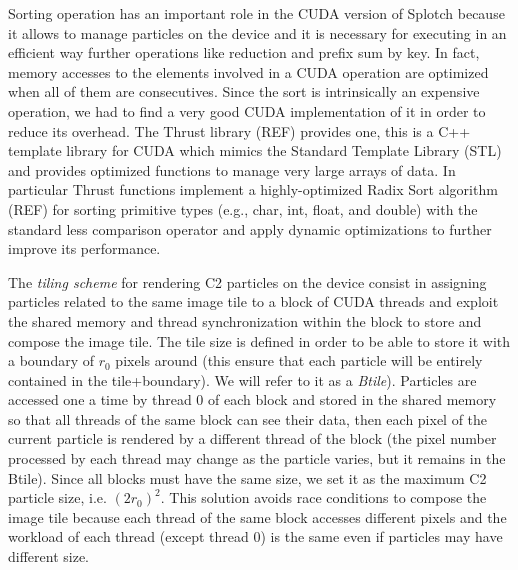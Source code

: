 \documentclass[11pt]{article}
\begin{document}
Sorting operation has an important role in the CUDA version of Splotch because it allows to manage particles on the device and it is necessary for executing in an efficient way further operations like reduction and prefix sum by key. In fact, memory accesses to the elements involved in a CUDA operation are optimized when all of them are consecutives. Since the sort is intrinsically an expensive operation, we had to find a very good CUDA implementation of it in order to reduce its overhead. 
The Thrust library (REF) provides one, this is a C++ template library for CUDA which mimics the Standard Template Library (STL) and provides optimized functions to manage very large arrays of data. In particular Thrust functions implement a highly-optimized Radix Sort algorithm (REF) for sorting primitive types (e.g., char, int, float, and double) with the standard less comparison operator and apply dynamic optimizations to further improve its performance.

The \textit{tiling scheme} for rendering C2 particles on the device consist in assigning particles related to the same image tile to a block of CUDA threads and exploit the shared memory and thread synchronization within the block to store and compose the image tile. The tile size is defined in order to be able to store it with a boundary of $r_0$ pixels around (this ensure that each particle will be entirely contained in the tile+boundary). We will refer to it as a \textit{Btile}). Particles are accessed one a time by thread 0 of each block and stored in the shared memory so that all threads of the same block can see their data, then each pixel of the current particle is rendered by a different thread of the block (the pixel number processed by each thread may change as the particle varies, but it remains in the Btile). Since all blocks must have the same size, we set it as the maximum C2 particle size, i.e. $(2r_0)^2$. 
This solution avoids race conditions to compose the image tile because each thread of the same block accesses different pixels and the workload of each thread (except thread 0) is the same even if particles may have different size.
\end{document}
